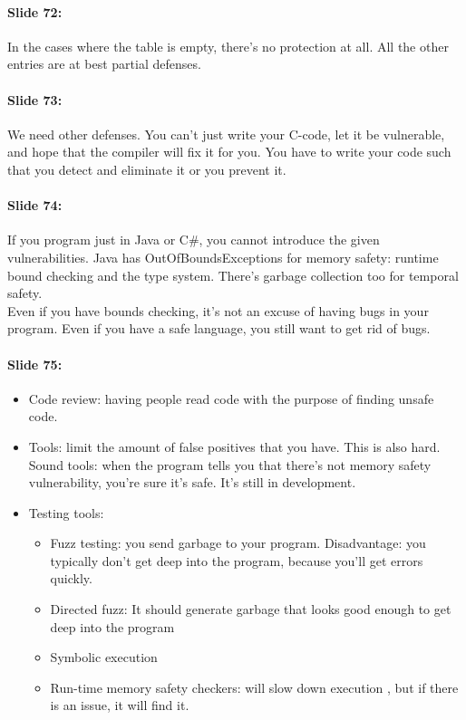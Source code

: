 \documentclass[10pt,a4paper]{report}
\begin{document}
\paragraph{Slide 72:} In the cases where the table is empty, there's no protection at all. All the other entries are at best partial defenses.

\paragraph{Slide 73:} We need other defenses. You can't just write your C-code, let it be vulnerable, and hope that the compiler will fix it for you. You have to write your code such that you detect and eliminate it or you prevent it.

\paragraph{Slide 74:} If you program just in Java or C\#, you cannot introduce the given vulnerabilities. Java has OutOfBoundsExceptions for memory safety: runtime bound checking and the type system. There's garbage collection too for temporal safety.\\
Even if you have bounds checking, it's not an excuse of having bugs in your program. Even if you have a safe language, you still want to get rid of bugs.

\paragraph{Slide 75:}
\begin{itemize}
\item Code review: having people read code with the purpose of finding unsafe code. 
\item Tools: limit the amount of false positives that you have. This is also hard. Sound tools: when the program tells you that there's not memory safety vulnerability, you're sure it's safe. It's still in development. 
\item Testing tools:
\begin{itemize}
\item Fuzz testing: you send garbage to your program. Disadvantage: you typically don't get deep into the program, because you'll get errors quickly. 
\item Directed fuzz: It should generate garbage that looks good enough to get deep into the program
\item Symbolic execution
\item Run-time memory safety checkers: will slow down execution
, but if there is an issue, it will find it. 
\end{itemize}
\end{itemize}
\end{document}
